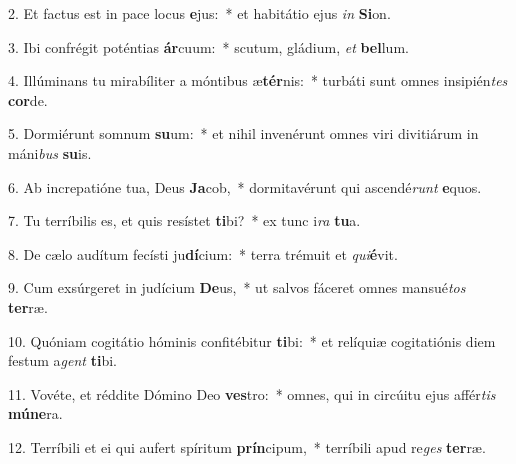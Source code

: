 2. Et factus est in pace locus \textbf{e}jus:~*  et habitátio ejus \textit{in} \textbf{Si}on.\

3. Ibi confrégit poténtias \textbf{ár}cuum:~*  scutum, gládium, \textit{et} \textbf{bel}lum.\

4. Illúminans tu mirabíliter a móntibus æ\textbf{tér}nis:~*  turbáti sunt omnes insipién\textit{tes} \textbf{cor}de.\

5. Dormiérunt somnum \textbf{su}um:~*  et nihil invenérunt omnes viri divitiárum in máni\textit{bus} \textbf{su}is.\

6. Ab increpatióne tua, Deus \textbf{Ja}cob,~*  dormitavérunt qui ascendé\textit{runt} \textbf{e}quos.\

7. Tu terríbilis es, et quis resístet \textbf{ti}bi?~*  ex tunc i\textit{ra} \textbf{tu}a.\

8. De cælo audítum fecísti ju\textbf{dí}cium:~*  terra trémuit et \textit{qui}\textbf{é}vit.\

9. Cum exsúrgeret in judícium \textbf{De}us,~*  ut salvos fáceret omnes mansué\textit{tos} \textbf{ter}ræ.\

10. Quóniam cogitátio hóminis confitébitur \textbf{ti}bi:~*  et relíquiæ cogitatiónis diem festum a\textit{gent} \textbf{ti}bi.\

11. Vovéte, et réddite Dómino Deo \textbf{ves}tro:~*  omnes, qui in circúitu ejus affér\textit{tis} \textbf{mú}\textbf{ne}ra.\

12. Terríbili et ei qui aufert spíritum \textbf{prín}cipum,~*  terríbili apud re\textit{ges} \textbf{ter}ræ.\

